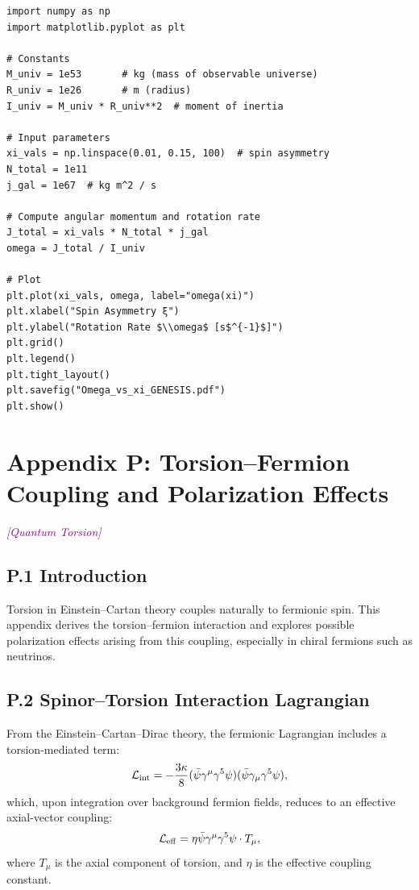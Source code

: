 \documentclass{article}
\newcommand{\quantumtag}{\textcolor{purple}{\textit{[Quantum Torsion]}}}
\begin{document}
\begin{verbatim}
import numpy as np
import matplotlib.pyplot as plt

# Constants
M_univ = 1e53       # kg (mass of observable universe)
R_univ = 1e26       # m (radius)
I_univ = M_univ * R_univ**2  # moment of inertia

# Input parameters
xi_vals = np.linspace(0.01, 0.15, 100)  # spin asymmetry
N_total = 1e11
j_gal = 1e67  # kg m^2 / s

# Compute angular momentum and rotation rate
J_total = xi_vals * N_total * j_gal
omega = J_total / I_univ

# Plot
plt.plot(xi_vals, omega, label="omega(xi)")
plt.xlabel("Spin Asymmetry ξ")
plt.ylabel("Rotation Rate $\\omega$ [s$^{-1}$]")
plt.grid()
plt.legend()
plt.tight_layout()
plt.savefig("Omega_vs_xi_GENESIS.pdf")
plt.show()
\end{verbatim}






\section*{Appendix P: Torsion–Fermion Coupling and Polarization Effects}
\label{app:torsion-fermion}
\quantumtag


\subsection*{P.1 Introduction}
Torsion in Einstein–Cartan theory couples naturally to fermionic spin. This appendix derives the torsion–fermion interaction and explores possible polarization effects arising from this coupling, especially in chiral fermions such as neutrinos.

\subsection*{P.2 Spinor–Torsion Interaction Lagrangian}
From the Einstein–Cartan–Dirac theory, the fermionic Lagrangian includes a torsion-mediated term:
\begin{equation}
\mathcal{L}_{\rm int} = -\frac{3\kappa}{8} (\bar{\psi} \gamma^\mu \gamma^5 \psi)(\bar{\psi} \gamma_\mu \gamma^5 \psi),
\end{equation}
which, upon integration over background fermion fields, reduces to an effective axial-vector coupling:
\begin{equation}
\mathcal{L}_{\rm eff} = \eta \bar{\psi} \gamma^\mu \gamma^5 \psi \cdot T_\mu,
\end{equation}
where \(T_\mu\) is the axial component of torsion, and \(\eta\) is the effective coupling constant.
\end{document}
